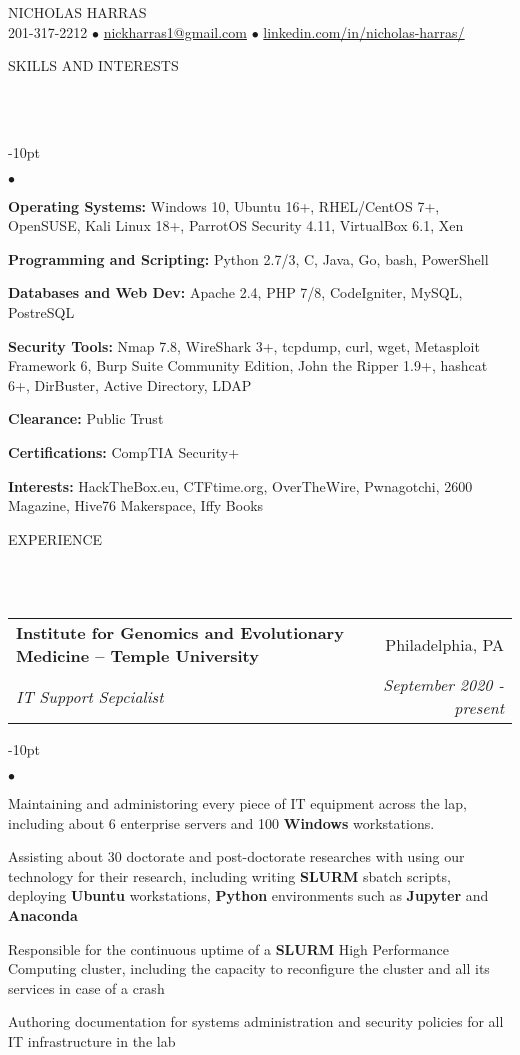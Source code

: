 \documentclass[12pt]{article}
\makeatletter
\newcommand{\mailto}[1]{
	\href{mailto:#1}{#1}
}
\newcommand{\contact}[2]{
	\vspace*{-8pt}
	\begin{center}
		{#1}\\ %
		#2
	\end{center}
	\vspace*{-12pt}
}
\newcommand{\header}[1]{
	\vspace*{12pt} %
	{\hspace*{-14pt}\vspace*{6pt} #1}
	\vspace*{-6pt} 
	\lineunder
}
\newcommand{\lineunder}{
	\vspace*{-8pt} \\ 
	\hspace*{-18pt} 
	\hrulefill \\
}
\newcommand{\subheading}[4]{
 	\vspace{5pt}
    	\begin{tabular*}{1.01\textwidth}
    		{l@{\extracolsep{\fill}}r}
      		\hspace{-16pt}\textbf{#1} & #2 \\
      		\hspace{-16pt}\textit{\small#3} & \textit{\small #4} \\
    	\end{tabular*}
    \vspace{-4pt}
}
\newenvironment{achievements}{
\begin{adjustwidth}{-10pt}{}
  \begin{list}{$\bullet$}{
  	\topsep 0pt \itemsep -4pt}}
  	{\vspace*{2pt}\end{list}
\end{adjustwidth}
}
\makeatother
\begin{document}
\small
\smallskip
\vspace*{-40pt}

\contact{\huge{N}\LARGE{ICHOLAS} \huge{H}\LARGE{ARRAS}}{201-317-2212 $\bullet$ \mailto{nickharras1@gmail.com} $\bullet$ \href{https://www.github.com/harras}{linkedin.com/in/nicholas-harras/}}


\vspace{-8pt}
\header{SKILLS AND INTERESTS}
	\begin{achievements}
		\item{\bf Operating Systems:} Windows 10, Ubuntu 16+, RHEL/CentOS 7+, OpenSUSE, Kali Linux 18+, ParrotOS Security 4.11, VirtualBox 6.1, Xen
		\item{\bf Programming and Scripting:} Python 2.7/3, C, Java, Go, bash, PowerShell
		\item{\bf Databases and Web Dev:} Apache 2.4, PHP 7/8, CodeIgniter, MySQL, PostreSQL
		\item{\bf Security Tools:} Nmap 7.8, WireShark 3+, tcpdump, curl, wget, Metasploit Framework 6, Burp Suite Community Edition, John the Ripper 1.9+, hashcat 6+, DirBuster, Active Directory, LDAP
		\item{\bf Clearance:} Public Trust
		\item{\bf Certifications:} CompTIA Security+
		\item{\bf Interests:} HackTheBox.eu, CTFtime.org, OverTheWire, Pwnagotchi, 2600 Magazine, Hive76 Makerspace, Iffy Books
	\end{achievements}

\vspace{-8pt}
\header{EXPERIENCE}

\subheading
	{Institute for Genomics and Evolutionary Medicine -- Temple University}{Philadelphia, PA}
	{IT Support Sepcialist}{September 2020 - present}
	\begin{achievements}
		\item Maintaining and administoring every piece of IT equipment across the lap, including about 6 enterprise servers and 100 \textbf{Windows} workstations. 
		\item Assisting about 30 doctorate and post-doctorate researches with using our technology for their research, including writing \textbf{SLURM} sbatch scripts, deploying \textbf{Ubuntu} workstations, \textbf{Python} environments such as \textbf{Jupyter} and \textbf{Anaconda}
		\item Responsible for the continuous uptime of a \textbf{SLURM} High Performance Computing cluster, including the capacity to reconfigure the cluster and all its services in case of a crash
		\item Authoring documentation for systems administration and security policies for all IT infrastructure in the lab
	\end{achievements}
\end{document}
